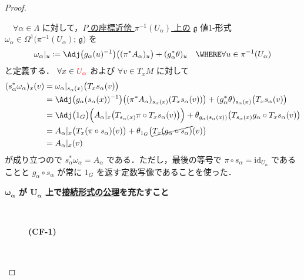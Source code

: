 \documentclass[geometry_main]{subfiles}
\begin{document}
\begin{proof}
\begin{enumerate}
        　$\forall \alpha \in \Lambda$ に対して，\underline{$P$ の座標近傍 $\pi^{-1}(U_\alpha)$ 上の} $\mathfrak{g}$ 値1-形式 $\omega_\alpha \in \Omega^1\bigl(\pi^{-1}(U_\alpha);\, \mathfrak{g}\bigr)$ を
        \begin{align}
            \label{def:patched-connection}
            \omega_\alpha|_u \coloneqq \Adj \bigl( g_\alpha(u)^{-1} \bigr)\bigl((\pi^* A_\alpha)_u\bigr) + (g_\alpha^*\theta)_u \quad \WHERE \forall u \in \pi^{-1}(U_\alpha)
        \end{align}
        と定義する．
        $\forall x \in \textcolor{red}{U_\alpha}$ および $\forall v \in T_{x} M$ に対して
        \begin{align}
            (s_\alpha^* \omega_\alpha)_{x}(v)
            &= \omega_\alpha|_{s_\alpha(x)} \bigl( T_{x} s_\alpha (v) \bigr) \\
            &= \Adj \bigl( g_\alpha(s_\alpha(x))^{-1} \bigr)\bigl((\pi^* A_\alpha)_{s_\alpha(x)}(T_x s_\alpha(v))\bigr) + (g_\alpha^*\theta)_{s_\alpha(x)}\bigl( T_{x} s_\alpha (v) \bigr) \\
            &= \Adj \bigl( 1_G \bigr)\Bigl(A_\alpha|_{x}\bigl(T_{s_\alpha(x)} \pi \circ T_x s_\alpha(v)\bigr)\Bigr) + \theta_{g_\alpha(s_\alpha(x))}\bigl( T_{s_\alpha(x)} g_\alpha \circ T_{x} s_\alpha (v) \bigr) \\
            &= A_\alpha|_{x}\bigl(T_x(\pi \circ s_\alpha)(v)\bigr) + \theta_{1_G}\bigl( \cancel{T_{x} (g_\alpha \circ s_\alpha)} (v) \bigr) \\
            &= A_\alpha|_{x}(v)
        \end{align}
        が成り立つので $s_\alpha^* \omega_\alpha = A_\alpha$ である．ただし，最後の等号で $\pi \circ s_\alpha = \mathrm{id}_{U_\alpha}$ であることと $g_\alpha \circ s_\alpha$ が常に $1_G$ を返す定数写像であることを使った．
        \begin{description}
            \item[\textbf{$\bm{\omega_\alpha}$ が $\bm{U_\alpha}$ 上で\hyperref[def:connection]{接続形式の公理}を充たすこと}]　
            
            \begin{description}
                \item[\textbf{(CF-1)}]　


\end{description}
\end{description}
\end{enumerate}
\end{proof}
\end{document}
